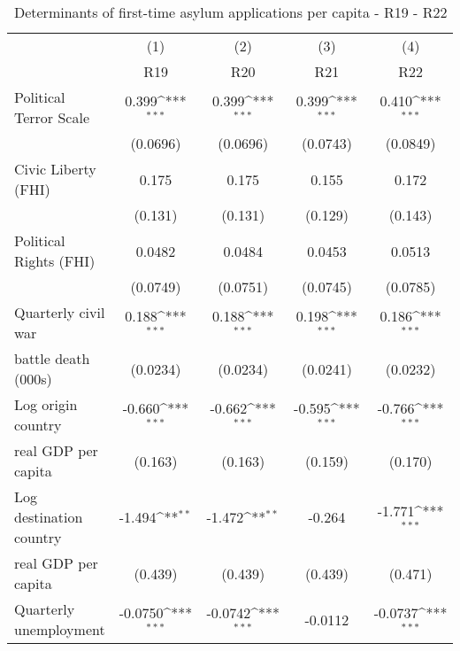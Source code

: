 \begin{table}[htbp]\centering  \footnotesize
\def\sym#1{\ifmmode^{#1}\else\(^{#1}\)\fi}
\caption{Determinants of first-time asylum applications per capita - R19 - R22}
\begin{tabular}{l*{4}{c}}
\hline\hline
	&\multicolumn{1}{c}{(1)}     &\multicolumn{1}{c}{(2)}       &\multicolumn{1}{c}{(3)}       &\multicolumn{1}{c}{(4)}   \\
                    &\multicolumn{1}{c}{R19}         &\multicolumn{1}{c}{R20}         &\multicolumn{1}{c}{R21}         &\multicolumn{1}{c}{R22}         \\
\hline
Political Terror Scale&       0.399\sym{***}&       0.399\sym{***}&       0.399\sym{***}&       0.410\sym{***}\\
                    &    (0.0696)         &    (0.0696)         &    (0.0743)         &    (0.0849)         \\
[0,5em]
Civic Liberty (FHI) &       0.175         &       0.175         &       0.155         &       0.172         \\
                    &     (0.131)         &     (0.131)         &     (0.129)         &     (0.143)         \\
[0,5em]
Political Rights (FHI)&      0.0482         &      0.0484         &      0.0453         &      0.0513         \\
                    &    (0.0749)         &    (0.0751)         &    (0.0745)         &    (0.0785)         \\
[0,5em]
Quarterly civil war&       0.188\sym{***}&       0.188\sym{***}&       0.198\sym{***}&       0.186\sym{***}\\
 battle death (000s)                    &    (0.0234)         &    (0.0234)         &    (0.0241)         &    (0.0232)         \\
[0,5em]
Log origin country &      -0.660\sym{***}&      -0.662\sym{***}&      -0.595\sym{***}&      -0.766\sym{***}\\
real GDP per capita                    &     (0.163)         &     (0.163)         &     (0.159)         &     (0.170)         \\
[0,5em]
Log destination country&      -1.494\sym{**} &      -1.472\sym{**} &      -0.264         &      -1.771\sym{***}\\
 real GDP per capita                    &     (0.439)         &     (0.439)         &     (0.439)         &     (0.471)         \\
[0,5em]
Quarterly unemployment&     -0.0750\sym{***}&     -0.0742\sym{***}&     -0.0112         &     -0.0737\sym{***}\\

\end{tabular}
\end{table}

